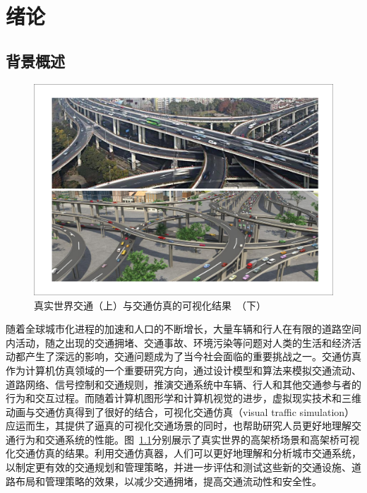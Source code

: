 
\chapter{绪论}

\section{背景概述}


\begin{figure}[!b]
\centering
\includegraphics[width=\textwidth]{figure/intro/example.pdf}
\caption[真实世界交通与交通仿真的可视化结果]{
真实世界交通（上）与交通仿真的可视化结果~\cite{chao2017realistic}（下）
}
\label{fig:intro_example}
\end{figure}

随着全球城市化进程的加速和人口的不断增长，大量车辆和行人在有限的道路空间内活动，随之出现的交通拥堵、交通事故、环境污染等问题对人类的生活和经济活动都产生了深远的影响，交通问题成为了当今社会面临的重要挑战之一。交通仿真作为计算机仿真领域的一个重要研究方向，通过设计模型和算法来模拟交通流动、道路网络、信号控制和交通规则，推演交通系统中车辆、行人和其他交通参与者的行为和交互过程。而随着计算机图形学和计算机视觉的进步，虚拟现实技术和三维动画与交通仿真得到了很好的结合，可视化交通仿真（visual traffic simulation）应运而生，其提供了逼真的可视化交通场景的同时，也帮助研究人员更好地理解交通行为和交通系统的性能。图~\ref{fig:intro_example}分别展示了真实世界的高架桥场景和高架桥可视化交通仿真的结果。利用交通仿真器，人们可以更好地理解和分析城市交通系统，以制定更有效的交通规划和管理策略，并进一步评估和测试这些新的交通设施、道路布局和管理策略的效果，以减少交通拥堵，提高交通流动性和安全性。



